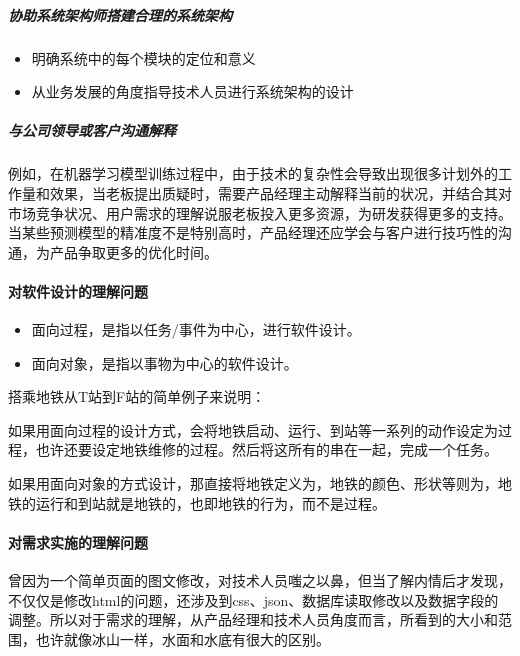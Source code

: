 \documentclass[letterpaper,11pt,english]{sphinxmanual}
\begin{document}
\subparagraph{协助系统架构师搭建合理的系统架构}
\label{\detokenize{chapter_idea/understand_tech:id7}}\begin{itemize}
\item {} 
明确系统中的每个模块的定位和意义

\item {} 
从业务发展的角度指导技术人员进行系统架构的设计

\end{itemize}


\subparagraph{与公司领导或客户沟通解释}
\label{\detokenize{chapter_idea/understand_tech:id8}}
例如，在机器学习模型训练过程中，由于技术的复杂性会导致出现很多计划外的工作量和效果，当老板提出质疑时，需要产品经理主动解释当前的状况，并结合其对市场竞争状况、用户需求的理解说服老板投入更多资源，为研发获得更多的支持。当某些预测模型的精准度不是特别高时，产品经理还应学会与客户进行技巧性的沟通，为产品争取更多的优化时间。%
\begin{footnote}[369]\sphinxAtStartFootnote
{}
%
\end{footnote}


\paragraph{对软件设计的理解问题}
\label{\detokenize{chapter_idea/understand_tech:id9}}\begin{itemize}
\item {} 
面向过程，是指以任务/事件为中心，进行软件设计。

\item {} 
面向对象，是指以事物为中心的软件设计。

\end{itemize}

搭乘地铁从T站到F站的简单例子来说明：

如果用面向过程的设计方式，会将地铁启动、运行、到站等一系列的动作设定为过程，也许还要设定地铁维修的过程。然后将这所有的串在一起，完成一个任务。

如果用面向对象的方式设计，那直接将地铁定义为，地铁的颜色、形状等则为，地铁的运行和到站就是地铁的，也即地铁的行为，而不是过程。


\paragraph{对需求实施的理解问题}
\label{\detokenize{chapter_idea/understand_tech:id10}}
曾因为一个简单页面的图文修改，对技术人员嗤之以鼻，但当了解内情后才发现，不仅仅是修改html的问题，还涉及到css、json、数据库读取修改以及数据字段的调整。所以对于需求的理解，从产品经理和技术人员角度而言，所看到的大小和范围，也许就像冰山一样，水面和水底有很大的区别。
\end{document}
